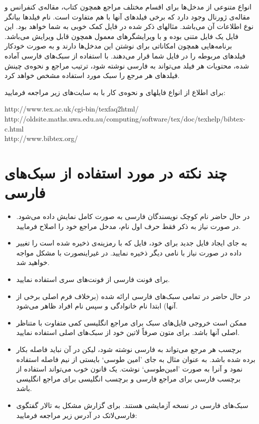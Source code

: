 \documentclass[11pt,a4paper]{article}
\theoremstyle{plain} \newtheorem{question}{پرسش}%
\begin{document}
انواع متنوعی از مدخل‌ها برای اقسام مختلف مراجع همچون کتاب، مقاله‌ی کنفرانس و مقاله‌ی ژورنال وجود دارد که برخی فیلدهای آنها با هم متفاوت است. 
نام فیلدها بیانگر نوع اطلاعات آن می‌باشد. مثالهای ذکر شده در فایل  کمک خوبی به شما خواهد بود. 
این فایل یک فایل متنی بوده و با ویرایشگرهای معمول همچون  قابل ویرایش می‌باشد. برنامه‌هایی همچون 
 امکاناتی برای نوشتن این مدخل‌ها دارند و به صورت خودکار فیلدهای مربوطه را در فایل   شما قرار می‌دهند.  
با استفاده از سبک‌های فارسی آماده شده، محتویات هر فیلد می‌تواند به فارسی نوشته شود، ترتیب مراجع و نحوه‌ی چینش فیلدهای هر مرجع را سبک مورد استفاده 
مشخص خواهد کرد.

برای اطلاع از انواع فایلهای  و نحوه‌ی کار با  به سایت‌های زیر مراجعه فرمایید:
\begin{roman}
\noindent http://www.tex.ac.uk/cgi-bin/texfaq2html/\\
\noindent http://oldsite.maths.uwa.edu.au/computing/software/tex/doc/texhelp/bibtex-c.html\\
\noindent http://www.bibtex.org/
\end{roman}

\section{چند نکته در مورد استفاده از سبک‌های فارسی}
\begin{itemize}
\item در حال حاضر نام کوچک نویسندگان فارسی به صورت کامل نمایش داده می‌شود. در صورت نیاز به ذکر فقط حرف اول نام، مدخل مراجع خود را اصلاح فرمایید.
\item به جای ایجاد فایل  جدید برای خود،  فایل  که با رمزینه‌ی  ذخیره شده است را تغییر داده در صورت نیاز با نامی دیگر ذخیره نمایید. 
در غیراینصورت با مشکل مواجه خواهید شد.
\item برای فونت فارسی از فونت‌های سری  استفاده نمایید.
\item در حال حاضر در تمامی سبک‌های فارسی ارائه شده (برخلاف فرم اصلی برخی از آنها) ابتدا نام خانوادگی و سپس نام افراد ظاهر می‌‌شود.
\item ممکن است خروجی فایل‌های سبک برای مراجع انگلیسی کمی متفاوت با متناظر اصلی آنها باشد. برای متون صرفاً لاتین خود از سبک‌های اصلی استفاده نمایید.
\item برچسب‌ هر مرجع می‌تواند به فارسی نوشته شود، لیکن در آن نباید فاصله بکار برده شده باشد. 
به عنوان مثال به جای 'امین طوسی` بایستی از نیم فاصله استفاده نمود و آنرا به صورت 'امین‌طوسی` نوشت.
یک قانون خوب می‌تواند استفاده از برچسب فارسی برای مراجع فارسی و برچسب انگلیسی برای مراجع انگلیسی باشد.
\item سبک‌های فارسی در نسخه‌ آزمایشی هستند. برای گزارش مشکل به تالار گفتگوی فارسی‌لاتک  در آدرس زیر مراجعه فرمایید:\hfill {}
\end{itemize}
\end{document}
